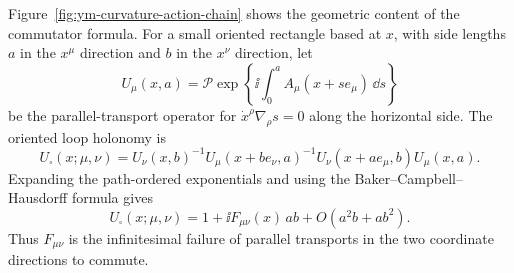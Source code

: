 Figure~\ref{fig:ym-curvature-action-chain} shows the geometric content of the
commutator formula.  For a small oriented rectangle based at \(x\), with side
lengths \(a\) in the \(x^\mu\) direction and \(b\) in the \(x^\nu\) direction,
let
\[
  U_\mu(x,a)
  =
  \mathcal P\exp\left\{\ii\int_0^a
  A_\mu(x+s e_\mu)\,\dd s\right\}
\]
be the parallel-transport operator for
\(\dot x^\rho\nabla_\rho s=0\) along the horizontal side.  The oriented loop
holonomy is
\[
  U_\square(x;\mu,\nu)
  =
  U_\nu(x,b)^{-1}
  U_\mu(x+b e_\nu,a)^{-1}
  U_\nu(x+a e_\mu,b)
  U_\mu(x,a).
\]
Expanding the path-ordered exponentials and using the
Baker--Campbell--Hausdorff formula gives
\[
  U_\square(x;\mu,\nu)
  =
  1+\ii F_{\mu\nu}(x)\,ab+O(a^2b+ab^2).
\]
Thus \(F_{\mu\nu}\) is the infinitesimal failure of parallel transports in the
two coordinate directions to commute.

